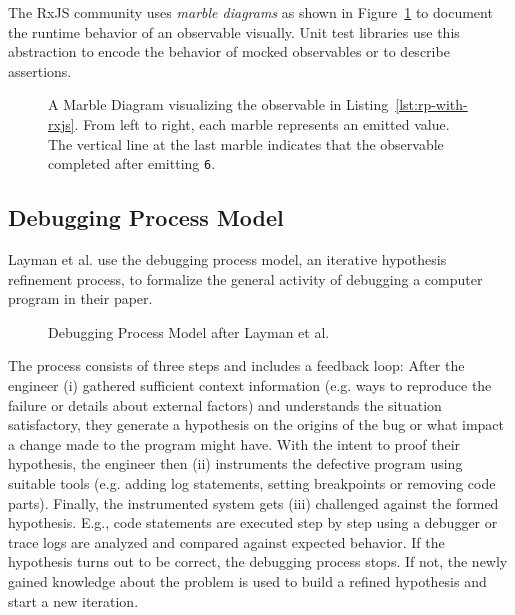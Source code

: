 \documentclass[sigplan,screen,review]{acmart}
\begin{document}
The RxJS community uses \emph{marble diagrams} as shown in Figure~\ref{fig:marble-diagram} to document \cite{marblediagrams} the runtime behavior of an observable visually. Unit test libraries\cite{marbletesting} use this abstraction to encode the behavior of mocked observables or to describe assertions.

\begin{figure}
	\centering
	\caption{A Marble Diagram visualizing the observable in Listing~\ref{lst:rp-with-rxjs}. From left to right, each marble represents an emitted value. The vertical line at the last marble indicates that the observable completed after emitting \texttt{6}.}
	\label{fig:marble-diagram}
\end{figure}

\subsection{Debugging Process Model}

Layman et al. \cite{Layman_Diep_Nagappan_Singer_Deline_Venolia_2013} use the debugging process model, an iterative hypothesis refinement process, to formalize the general activity of debugging a computer program in their paper.

\begin{figure}
	\centering
	\caption{Debugging Process Model after Layman et al. \cite{Layman_Diep_Nagappan_Singer_Deline_Venolia_2013}}
	\label{fig:debugging-process-model}
\end{figure}

The process consists of three steps and includes a feedback loop: After the engineer (i) gathered sufficient context information (e.g. ways to reproduce the failure or details about external factors) and understands the situation satisfactory, they generate a hypothesis on the origins of the bug or what impact a change made to the program might have. With the intent to proof their hypothesis, the engineer then (ii) instruments the defective program using suitable tools (e.g. adding log statements, setting breakpoints or removing code parts). Finally, the instrumented system gets (iii) challenged against the formed hypothesis. E.g., code statements are executed step by step using a debugger or trace logs are analyzed and compared against expected behavior. If the hypothesis turns out to be correct, the debugging process stops. If not, the newly gained knowledge about the problem is used to build a refined hypothesis and start a new iteration.
\end{document}
